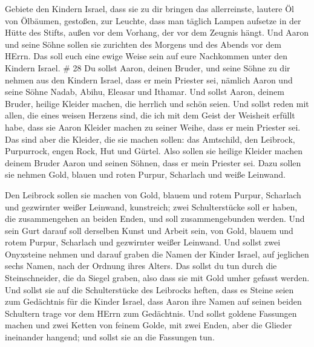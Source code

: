  Gebiete den Kindern Israel, dass sie zu dir bringen das
allerreinste, lautere Öl von Ölbäumen, gestoßen, zur Leuchte, dass man
täglich Lampen aufsetze  in der Hütte des Stifts, außen vor
dem Vorhang, der vor dem Zeugnis hängt. Und Aaron und seine Söhne sollen
sie zurichten des Morgens und des Abends vor dem HErrn. Das soll euch
eine ewige Weise sein auf eure Nachkommen unter den Kindern Israel. \#
28  Du sollst Aaron, deinen Bruder, und seine Söhne zu dir
nehmen aus den Kindern Israel, dass er mein Priester sei, nämlich Aaron
und seine Söhne Nadab, Abihu, Eleasar und Ithamar.  Und
sollst Aaron, deinem Bruder, heilige Kleider machen, die herrlich und
schön seien.  Und sollst reden mit allen, die eines weisen
Herzens sind, die ich mit dem Geist der Weisheit erfüllt habe, dass sie
Aaron Kleider machen zu seiner Weihe, dass er mein Priester sei.
 Das sind aber die Kleider, die sie machen sollen: das
Amtschild, den Leibrock, Purpurrock, engen Rock, Hut und Gürtel. Also
sollen sie heilige Kleider machen deinem Bruder Aaron und seinen Söhnen,
dass er mein Priester sei.  Dazu sollen sie nehmen Gold,
blauen und roten Purpur, Scharlach und weiße Leinwand.

 Den Leibrock sollen sie machen von Gold, blauem und rotem
Purpur, Scharlach und gezwirnter weißer Leinwand, kunstreich;
 zwei Schulterstücke soll er haben, die zusammengehen an
beiden Enden, und soll zusammengebunden werden.  Und sein
Gurt darauf soll derselben Kunst und Arbeit sein, von Gold, blauem und
rotem Purpur, Scharlach und gezwirnter weißer Leinwand.  Und
sollst zwei Onyxsteine nehmen und darauf graben die Namen der Kinder
Israel,  auf jeglichen sechs Namen, nach der Ordnung ihres
Alters.  Das sollst du tun durch die Steinschneider, die da
Siegel graben, also dass sie mit Gold umher gefasst werden.
 Und sollst sie auf die Schulterstücke des Leibrocks
heften, dass es Steine seien zum Gedächtnis für die Kinder Israel, dass
Aaron ihre Namen auf seinen beiden Schultern trage vor dem HErrn zum
Gedächtnis.  Und sollst goldene Fassungen machen
 und zwei Ketten von feinem Golde, mit zwei Enden, aber die
Glieder ineinander hangend; und sollst sie an die Fassungen tun.

